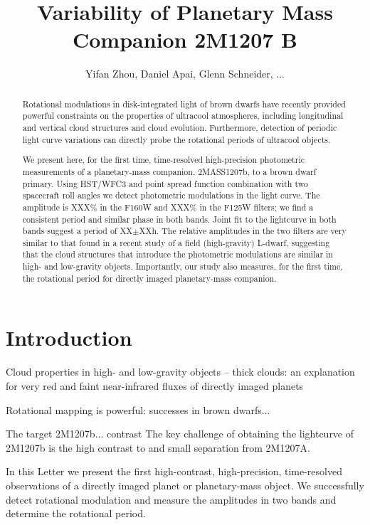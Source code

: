 \documentclass[apj]{emulateapj}
\begin{document}
\title{Variability of Planetary Mass Companion 2M1207 B}
\author{Yifan Zhou, Daniel Apai, Glenn Schneider, ...}

\begin{abstract} Rotational modulations in disk-integrated light of
brown dwarfs have recently provided powerful constraints on the
properties of ultracool atmospheres, including longitudinal and
vertical cloud structures and cloud evolution. Furthermore, detection
of periodic light curve variations can directly probe the rotational
periods of ultracool objects.

We present here, for the first time, time-resolved high-precision
photometric measurements of a planetary-mass companion, 2MASS1207b, to
a brown dwarf primary. Using HST/WFC3 and point spread function %
combination with two spacecraft roll angles we detect photometric
modulations in the light curve. The amplitude is XXX\% in the F160W
and XXX\% in the F125W filters; we find a consistent period and
similar phase in both bands. Joint fit to the lightcurve in both bands
suggest a period of XX$\pm$XXh. The relative amplitudes in the two
filters are very similar to that found in a recent study of a field
(high-gravity) L-dwarf, suggesting that the cloud structures that
introduce the photometric modulations are similar in high- and
low-gravity objects. Importantly, our study also measures, for the
first time, the rotational period for directly imaged planetary-mass
companion.
\end{abstract}

\maketitle
%
\section{Introduction}

Cloud properties in high- and low-gravity objects -- thick clouds: an
explanation for very red and faint near-infrared fluxes of directly
imaged planets

Rotational mapping is powerful: successes in brown dwarfs...

The target 2M1207b... contrast The key challenge of obtaining the
lightcurve of 2M1207b is the high contrast to and small separation
from 2M1207A.


In this Letter we present the first high-contrast, high-precision,
time-resolved observations of a directly imaged planet or
planetary-mass object. We successfully detect rotational modulation
and measure the amplitudes in two bands and determine the rotational
period.
\end{document}
